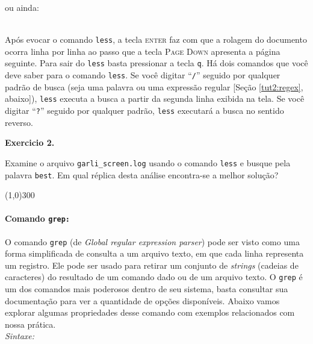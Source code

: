 \begin{refsection}
ou ainda:

\\

Após evocar o comando \texttt{less}, a tecla \textsc{enter} faz com que a rolagem do documento ocorra linha por linha ao passo que a tecla \textsc{Page Down} apresenta a página seguinte. Para sair do \texttt{less} basta pressionar a tecla \texttt{q}. Há dois comandos que você deve saber para o comando \texttt{less}. Se você digitar ``\texttt{/}'' seguido por qualquer padrão de busca (seja uma palavra ou uma expressão regular [Seção \ref{tut2:regex}, abaixo]), \texttt{less} executa a busca a partir da segunda linha exibida na tela. Se você digitar ``\texttt{?}'' seguido por qualquer padrão,  \texttt{less} executará a busca no sentido reverso.\\

\begin{blackBlock}{\textbf{Exercicio 2.}}\label{tut2:ex:2.\arabic{ex}}

Examine o arquivo \texttt{garli\_screen.log} usando o comando \texttt{less} e busque pela palavra \texttt{best}. Em qual réplica desta análise encontra-se a melhor solução?
\begin{center}
\line(1,0){300}\\
\end{center}

\end{blackBlock}

\paragraph{Comando \texttt{grep:}}\label{tut2:text:editors:texttools:grep}

O comando \texttt{grep} (de \textit{Global regular expression parser}) pode ser visto como uma forma simplificada de consulta a um arquivo texto, em que cada linha representa um registro. Ele pode ser usado para retirar um conjunto de \textit{strings} (cadeias de caracteres) do resultado de um comando dado ou de um arquivo texto. O \texttt{grep} é um dos comandos mais poderosos dentro de seu sistema, basta consultar sua documentação para ver a quantidade de opções disponíveis. Abaixo vamos explorar algumas propriedades desse comando com exemplos relacionados com nossa prática.\\
\textit{Sintaxe:}\\
 \\


\end{refsection}
